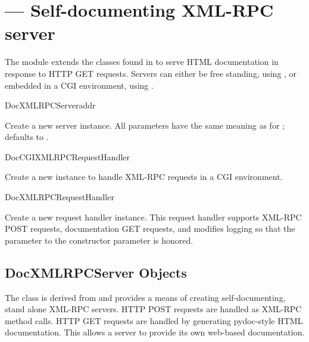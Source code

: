 \section{ ---
         Self-documenting XML-RPC server}



The  module extends the classes found in
 to serve HTML documentation in response to
HTTP GET requests. Servers can either be free standing, using
, or embedded in a CGI environment, using
.

\begin{classdesc}{DocXMLRPCServer}{addr}

Create a new server instance. All parameters have the same meaning as
for ;
 defaults to .

\end{classdesc}

\begin{classdesc}{DocCGIXMLRPCRequestHandler}{}

Create a new instance to handle XML-RPC requests in a CGI environment.

\end{classdesc}

\begin{classdesc}{DocXMLRPCRequestHandler}{}

Create a new request handler instance. This request handler supports
XML-RPC POST requests, documentation GET requests, and modifies
logging so that the  parameter to the
 constructor parameter is honored.

\end{classdesc}

\subsection{DocXMLRPCServer Objects \label{doc-xmlrpc-servers}}

The  class is derived from
 and provides a means of
creating self-documenting, stand alone XML-RPC servers. HTTP POST
requests are handled as XML-RPC method calls. HTTP GET requests are
handled by generating pydoc-style HTML documentation. This allows a
server to provide its own web-based documentation.

